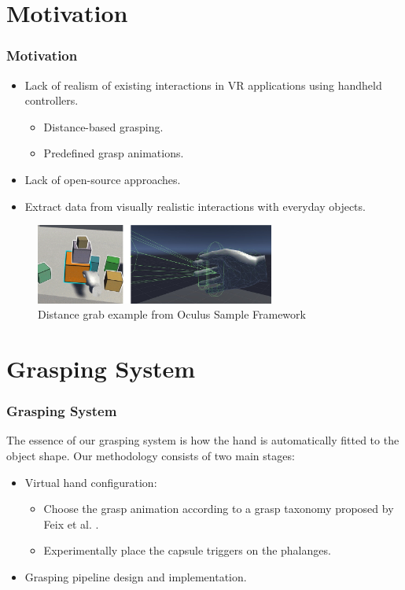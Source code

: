 \documentclass{beamer}
\theoremstyle{remark}
\theoremstyle{plain}
\begin{document}
\section{Motivation}

\begin{frame}
\frametitle{Motivation}
\begin{itemize}
	\item Lack of realism of existing interactions in VR applications using handheld controllers.
	\begin{itemize}
		\item Distance-based grasping.
		\item Predefined grasp animations.
	\end{itemize}
	\item Lack of open-source approaches.
	\item Extract data from visually realistic interactions with everyday objects.
\end{itemize}

\begin{figure}
	\centering
	\includegraphics[width=0.7\textwidth]{images/grab}
	\caption{Distance grab example from Oculus Sample Framework \cite{oculusGrab}}
\end{figure}
\end{frame}


\section{Grasping System}

\begin{frame}
\frametitle{Grasping System}
The essence of our grasping system is how the hand is automatically fitted to the object shape. Our methodology consists of two main stages:
\begin{itemize}
	\item Virtual hand configuration:
	\begin{itemize}
		\item Choose the grasp animation according to a grasp taxonomy proposed by Feix et al. \cite{feix2016grasp}.
		\item Experimentally place the capsule triggers on the phalanges.
	\end{itemize}
	\item Grasping pipeline design and implementation.
\end{itemize}
\end{frame}
\end{document}
